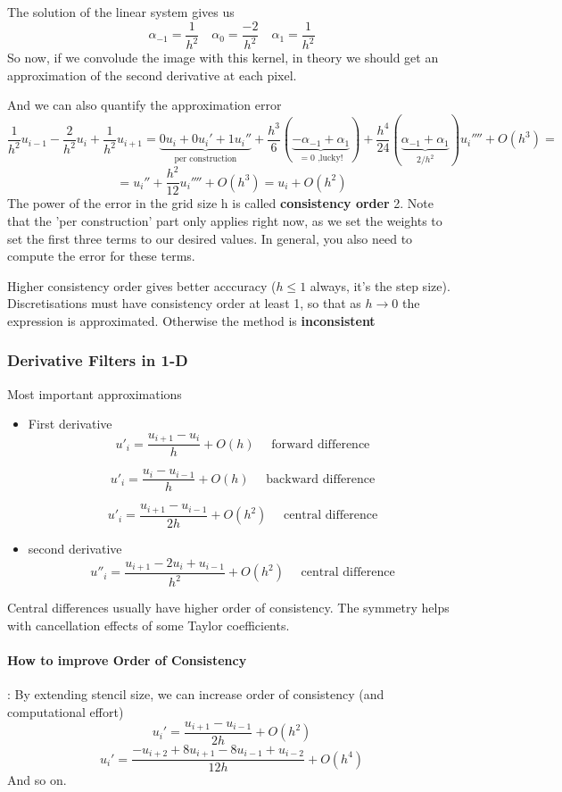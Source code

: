 \documentclass{article}
\begin{document}
The solution of the linear system gives us 
\[\alpha_{-1} = \frac{1}{h^2} \quad \alpha_0 = \frac{-2}{h^2} \quad \alpha_1 = \frac{1}{h^2}\]
So now, if we convolude the image with this kernel, in theory we should get an approximation of the second derivative at each pixel.

And we can also quantify the approximation error
\[\frac{1}{h^2}u_{i-1} - \frac{2}{h^2}u_i + \frac{1}{h^2}u_{i+1} = \underbrace{0u_i + 0u_i' + 1u_i''}_{\text{per construction}} + \frac{h^3}{6}(\underbrace{-\alpha_{-1} + \alpha_1}_{= 0\text{ ,lucky!}}) + \frac{h^4}{24}(\underbrace{\alpha_{-1} + \alpha_1}_{2/h^2})u_i'''' + O(h^3) = \]
\[= u_i'' + \frac{h^2}{12}u_i'''' + O(h^3) = u_i + O(h^2)\]
The power of the error in the grid size h is called \textbf{consistency order} 2. Note that the 'per construction' part only applies right now, as we set the weights to set the first three terms to our desired values. In general, you also need to compute the error for these terms.

Higher consistency order gives better acccuracy ($h \leq 1$ always, it's the step size). Discretisations must have consistency order at least 1, so that as $h\to 0$ the expression is approximated. Otherwise the method is \textbf{inconsistent}

\subsubsection{Derivative Filters in 1-D}
Most important approximations
\begin{itemize}
  \item First derivative
  \[u'_i = \frac{u_{i+1} - u_i}{h} + O(h) \quad \text{ forward difference}\]

  \[u'_i = \frac{u_i - u_{i-1}}{h} + O(h) \quad \text{ backward difference}\]

  \[u'_i = \frac{u_{i+1} - u_{i-1}}{2h} + O(h^2) \quad \text{ central difference}\]
  \item second derivative
  \[u''_i = \frac{u_{i+1} - 2u_i  + u_{i-1}}{h^2} + O(h^2) \quad \text{ central difference}\]
 
\end{itemize}
Central differences usually have higher order of consistency. The symmetry helps with cancellation effects of some Taylor coefficients.

\paragraph{How to improve Order of Consistency}: By extending stencil size, we can increase order of consistency (and computational effort)
\[u_i' = \frac{u_{i+1} - u_{i-1}}{2h} + O(h^2)\]
\[u_i' = \frac{-u_{i+2} + 8u_{i+1} - 8u_{i-1} + u_{i-2}}{12h} + O(h^4)\]
And so on.
\end{document}
